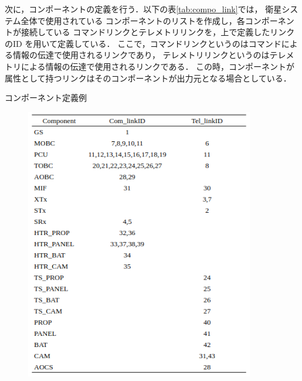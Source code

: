 \documentclass[11pt]{jsreport}
\begin{document}
次に，コンポーネントの定義を行う．以下の表\ref{tab:compo_link}では，
衛星システム全体で使用されている
コンポーネントのリストを作成し，各コンポーネントが接続している
コマンドリンクとテレメトリリンクを，上で定義したリンクのID
を用いて定義している．
ここで，コマンドリンクというのはコマンドによる情報の伝達で使用されるリンクであり，
テレメトリリンクというのはテレメトリによる情報の伝達で使用されるリンクである．
この時，コンポーネントが属性として持つリンクはそのコンポーネントが出力元となる場合としている．

\newpage
\begin{table}[H]
   \centering
   \caption{コンポーネント定義例}
   \label{tab:compo_link}
\end{table}
\vspace{-2zh}
\begin{figure}[H]
   \centering
      \includegraphics[width=10cm]{figure/compo_link.png}
\end{figure}
\end{document}

